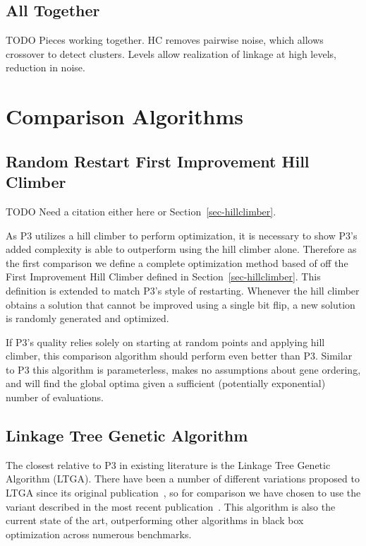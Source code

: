 \documentclass{sig-alternate}
\begin{document}
\subsection{All Together}
\label{sec-alltogether}
TODO Pieces working together.  HC removes pairwise noise, which allows crossover to detect
clusters.  Levels allow realization of linkage at high levels, reduction in noise.

\section{Comparison Algorithms}

\subsection{Random Restart First Improvement Hill Climber}
TODO Need a citation either here or Section~\ref{sec-hillclimber}.

As P3 utilizes a hill climber to perform optimization, it is necessary to show P3's
added complexity is able to outperform using the hill climber alone.  Therefore
as the first comparison we define a complete optimization method based of off the
First Improvement Hill Climber defined in Section~\ref{sec-hillclimber}.  This definition
is extended to match P3's style of restarting. Whenever the hill climber
obtains a solution that cannot be improved using a single bit flip, a new solution
is randomly generated and optimized.

If P3's quality relies solely on starting at random points and applying hill climber,
this comparison algorithm should perform even better than P3.  Similar to P3 this
algorithm is parameterless, makes no assumptions about gene ordering, and will
find the global optima given a sufficient (potentially exponential) number of evaluations.

\subsection{Linkage Tree Genetic Algorithm}
\label{sec-ltga}
The closest relative to P3 in existing literature is the Linkage Tree Genetic Algorithm
(LTGA).  There have been a number of different variations proposed to LTGA since
its original publication~\cite{thierens:2010:ltga}, so for comparison we have chosen
to use the variant described in the most recent publication~\cite{thierens:2013:ltgahiff}.
This algorithm is also the current state of the art, outperforming other algorithms
in black box optimization across numerous benchmarks.
\end{document}
